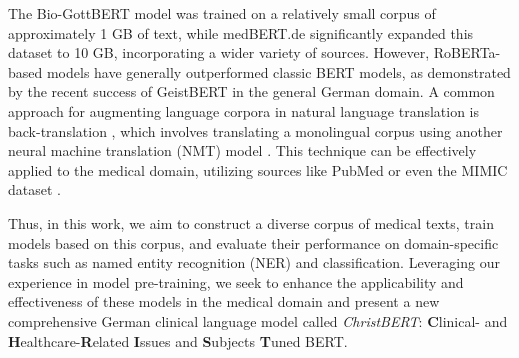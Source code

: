 The Bio-GottBERT model was trained on a relatively small corpus of approximately
1 GB of text, while medBERT.de significantly expanded this dataset to 10 GB,
incorporating a wider variety of sources. However, RoBERTa-based models have
generally outperformed classic BERT models, as demonstrated by the recent
success of GeistBERT in the general German domain. A common approach for
augmenting language corpora in natural language translation is back-translation
\cite{edunov2018understanding}, which involves translating a monolingual corpus
using another neural machine translation (NMT) model \cite{ng2019facebook}. This
technique can be effectively applied to the medical domain, utilizing sources
like PubMed or even the MIMIC dataset \cite{johnson2016mimic}.

Thus, in this work, we aim to construct a diverse corpus of medical texts, train
models based on this corpus, and evaluate their performance on domain-specific
tasks such as named entity recognition (NER) and classification. Leveraging our
experience in model pre-training, we seek to enhance the applicability and
effectiveness of these models in the medical domain and present  a new
comprehensive German clinical language model called \textit{ChristBERT}:
\textbf{C}linical- and \textbf{H}ealthcare-\textbf{R}elated \textbf{I}ssues and
\textbf{S}ubjects \textbf{T}uned BERT.
